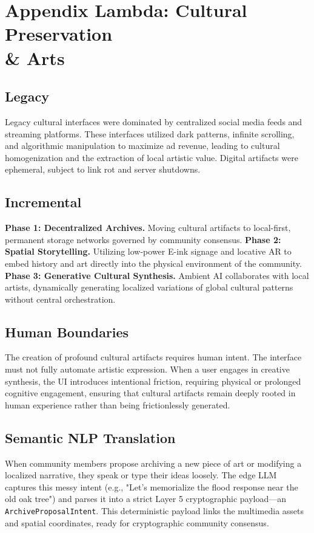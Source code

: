 \chapter{Appendix Lambda: Cultural Preservation \\\& Arts}

\section{Legacy}
Legacy cultural interfaces were dominated by centralized social media feeds and streaming platforms. These interfaces utilized dark patterns, infinite scrolling, and algorithmic manipulation to maximize ad revenue, leading to cultural homogenization and the extraction of local artistic value. Digital artifacts were ephemeral, subject to link rot and server shutdowns.

\section{Incremental}
\textbf{Phase 1: Decentralized Archives.} Moving cultural artifacts to local-first, permanent storage networks governed by community consensus.
\textbf{Phase 2: Spatial Storytelling.} Utilizing low-power E-ink signage and locative AR to embed history and art directly into the physical environment of the community.
\textbf{Phase 3: Generative Cultural Synthesis.} Ambient AI collaborates with local artists, dynamically generating localized variations of global cultural patterns without central orchestration.

\section{Human Boundaries}
The creation of profound cultural artifacts requires human intent. The interface must not fully automate artistic expression. When a user engages in creative synthesis, the UI introduces intentional friction, requiring physical or prolonged cognitive engagement, ensuring that cultural artifacts remain deeply rooted in human experience rather than being frictionlessly generated.

\section{Semantic NLP Translation}
When community members propose archiving a new piece of art or modifying a localized narrative, they speak or type their ideas loosely. The edge LLM captures this messy intent (e.g., "Let's memorialize the flood response near the old oak tree") and parses it into a strict Layer 5 cryptographic payload—an \texttt{ArchiveProposalIntent}. This deterministic payload links the multimedia assets and spatial coordinates, ready for cryptographic community consensus.

